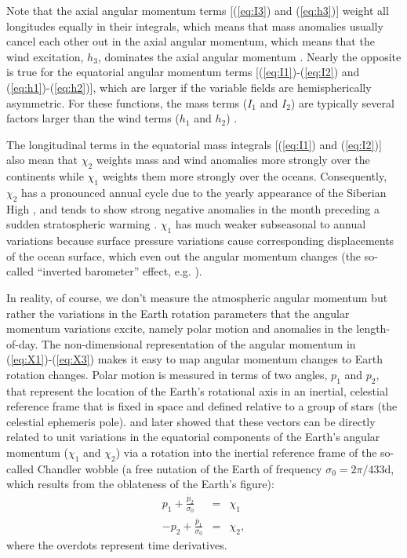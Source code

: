 Note that the axial angular momentum terms [(\ref{eq:I3}) and (\ref{eq:h3})] weight all longitudes equally in their integrals, which means that mass anomalies usually cancel each other out in the axial angular momentum, which means that the wind excitation, $h_3$, dominates the axial angular momentum  \citep{barnesetal1983}.
%
Nearly the opposite is true for the equatorial angular momentum terms [(\ref{eq:I1})-(\ref{eq:I2}) and (\ref{eq:h1})-(\ref{eq:h2})], which are larger if the variable fields are hemispherically asymmetric.
For these functions, the mass terms ($I_1$ and $I_2$) are typically several factors larger than the wind terms ($h_1$ and $h_2$)  \citep{barnesetal1983}.

The longitudinal terms in the equatorial mass integrals [(\ref{eq:I1}) and (\ref{eq:I2})] also mean that $\chi_2$ weights mass and wind anomalies more strongly over the continents while $\chi_1$ weights them more strongly over the oceans.
Consequently, $\chi_2$ has a pronounced annual cycle due to the yearly appearance of the Siberian High \citep{dobslawetal2010}, and tends to show strong negative anomalies in the month preceding a sudden stratospheric warming \citep{Neef2014}.
$\chi_1$ has much weaker subseasonal to annual variations because surface pressure variations cause corresponding displacements of the ocean surface, which even out the angular momentum changes (the so-called ``inverted barometer'' effect, e.g. \citet{salsteinrosen1989}).

In reality, of course, we don't measure the atmospheric angular momentum but rather the variations in the Earth rotation parameters that the angular momentum variations excite, namely polar motion and anomalies in the length-of-day. 
The non-dimensional representation of the angular momentum in (\ref{eq:X1})-(\ref{eq:X3}) makes it easy to map angular momentum changes to Earth rotation changes. 
Polar motion is measured in terms of two angles, $p_1$ and $p_2$, that represent the location of the Earth's rotational axis in an inertial, celestial reference frame that is fixed in space and defined relative to a group of stars (the celestial ephemeris pole).
\citet{barnesetal1983} and later \citet{Gross1992} showed that these vectors can be directly related to unit variations in the equatorial components of the Earth's angular momentum ($\chi_1$ and $\chi_2$) via a rotation into the inertial reference frame of the so-called Chandler wobble (a free nutation of the Earth of frequency 
$\sigma_0 = 2\pi/ 433\text{d}$, which results from the oblateness of the Earth's figure):
\begin{eqnarray}
  p_1 + \frac{\dot{p_2}}{\sigma_0} &=& \chi_1 \\
  -p_2 + \frac{\dot{p_1}}{\sigma_0} &=& \chi_2,
\label{eq:X12_to_PM}
\end{eqnarray}
where the overdots represent time derivatives.

